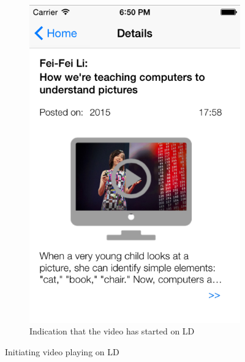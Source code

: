 \begin{figure}
\begin{subfigure}[b]{0.3\textwidth}
        \includegraphics[width=\textwidth]{figures/playSDc}
        \caption{Indication that the video has started on LD}
        \label{fig:figure45c}
    \end{subfigure}
    \caption{Initiating video playing on LD}\label{fig:figure45}
\end{figure}
